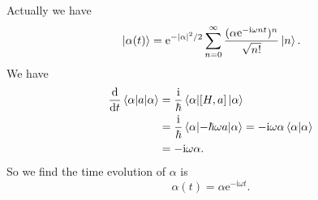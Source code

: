 \documentclass[hyperref, a4paper]{article}
\newcommand*{\ii}{\mathrm{i}}
\newcommand*{\ee}{\mathrm{e}}
\begin{document}
Actually we have 
\begin{equation}
    \ket*{\alpha(t)} = \ee^{- \abs*{\alpha}^2 / 2} \sum_{n=0}^{\infty} \frac{(\alpha \ee^{- \ii \omega n t})^n}{\sqrt{n!}} \ket*{n}. 
\end{equation}
We have 
\begin{equation}
    \begin{aligned}
        \dv{t} \expval*{a}{\alpha} &= \frac{\ii}{\hbar} \expval*{\comm*{H}{a}}{\alpha} \\
        &= \frac{\ii}{\hbar} \expval*{-\hbar \omega a}{\alpha} = - \ii \omega \alpha \braket*{\alpha}{\alpha} \\ 
        &= - \ii \omega \alpha .
    \end{aligned}
\end{equation}
So we find the time evolution of $\alpha$ is 
\begin{equation}
    \alpha(t) = \alpha \ee^{- \ii \omega t}.
\end{equation}
\end{document}
